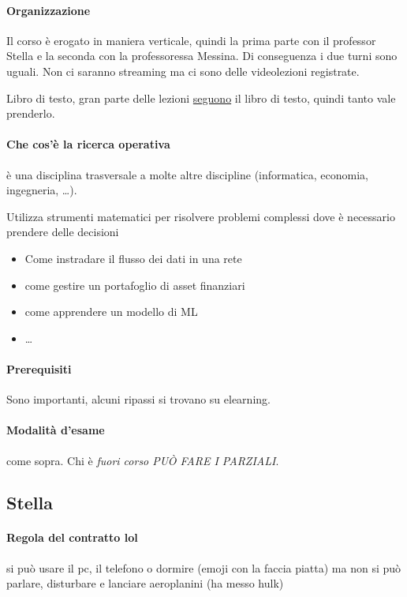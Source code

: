 \documentclass[12pt, a4paper, openany]{book}
\begin{document}
\paragraph*{Organizzazione}Il corso è erogato in maniera verticale, quindi la prima parte con il professor Stella e la seconda con la professoressa Messina.
Di conseguenza i due turni sono uguali. Non ci saranno streaming ma ci sono delle videolezioni registrate.

Libro di testo, gran parte delle lezioni \underline{seguono} il libro di testo, quindi tanto vale prenderlo. 

\paragraph*{Che cos'è la ricerca operativa}
è una disciplina trasversale a molte altre discipline (informatica, economia, ingegneria, \dots).

Utilizza strumenti matematici per risolvere problemi complessi dove è necessario prendere delle decisioni
\begin{itemize}
    \item Come instradare il flusso dei dati in una rete
    \item come gestire un portafoglio di asset finanziari
    \item come apprendere un modello di ML
    \item \dots
\end{itemize}

\paragraph*{Prerequisiti} Sono importanti, alcuni ripassi si trovano su elearning.
\paragraph*{Modalità d'esame} come sopra. Chi è \emph{fuori corso PUÒ FARE I PARZIALI}.

\subsection*{Stella}
\paragraph*{Regola del contratto \small{lol}} si può usare il pc, il telefono o dormire (emoji con la faccia piatta) ma non si può parlare, disturbare e lanciare aeroplanini (ha messo hulk)
\end{document}
